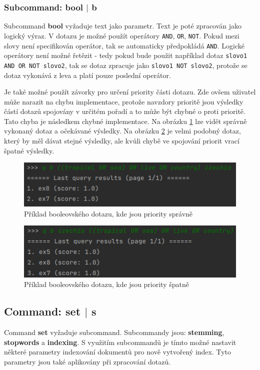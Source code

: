 \documentclass[12pt, letterpaper]{article}
\begin{document}
\subsubsection{Subcommand: bool $|$ b}
Subcommand \textbf{bool} vyžaduje text jako parametr. Text je poté zpracován jako logický výraz. V dotazu
je možné použít operátory \texttt{AND}, \texttt{OR}, \texttt{NOT}. Pokud mezi slovy není specifikován operátor, tak
se automaticky předpokládá \texttt{AND}. Logické operátory není možné řetězit - tedy pokud bude použit například
dotaz \texttt{slovo1 AND OR NOT slovo2}, tak se dotaz zpracuje jako \texttt{slovo1 NOT slovo2}, protože se dotaz
vykonává z leva a platí pouze poslední operátor.

Je také možné použít závorky pro určení priority části dotazu. Zde ovšem uživatel může narazit na chybu implementace,
protože navzdory prioritě jsou výsledky částí dotazů spojovány v určitém pořadí a to může být chybné o proti prioritě.
Tato chyba je následkem chybné implementace. Na obrázku \ref{fig:bool_correct} lze vidět správně vykonaný dotaz a
očekávané výsledky. Na obrázku \ref{fig:bool_wrong} je velmi podobný dotaz, který by měl dávat stejné výsledky,
ale kvůli chybě ve spojování priorit vrací špatné výsledky.

\begin{figure}[H]
    \centering
    \includegraphics[width=\linewidth]{img/bool_correct}
    \caption{Příklad booleovského dotazu, kde jsou priority správně}
    \label{fig:bool_correct}
\end{figure}

\begin{figure}[H]
    \centering
    \includegraphics[width=\linewidth]{img/bool_wrong}
    \caption{Příklad booleovského dotazu, kde jsou priority špatně}
    \label{fig:bool_wrong}
\end{figure}
%
\subsection{Command: set $|$ s}
Command \textbf{set} vyžaduje subcommand. Subcommandy jsou: \textbf{stemming}, \textbf{stopwords} a \textbf{indexing}.
S využitím subcommandů je tímto možné nastavit některé parametry indexování dokumentů pro nově vytvořený index.
Tyto parametry jsou také aplikovány při zpracování dotazů.
%
\end{document}
